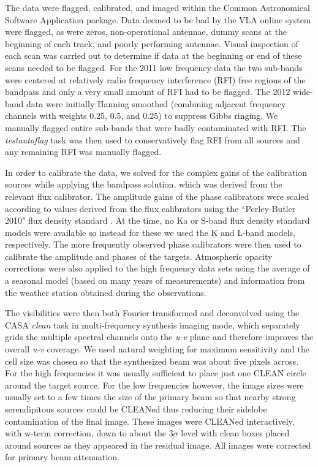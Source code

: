 \documentclass[iop]{emulateapj}
\begin{document}
The data were flagged, calibrated, and imaged within the Common Astronomical Software Application  \cite[CASA;][]{2007ASPC..376..127M} package. Data deemed to be bad by the VLA online system were flagged, as were zeros, non-operational antennae, dummy scans at the beginning of each track, and poorly performing antennae. Visual inspection of each scan was carried out to determine if data at the beginning or end of these scans needed to be flagged. For the 2011 low frequency data the two sub-bands were centered at relatively radio frequency interference (RFI) free regions of the bandpass and only a very small amount of RFI had to be flagged.   The 2012 wide-band data were initially Hanning smoothed (combining adjacent frequency channels with weights 0.25, 0.5, and 0.25) to suppress Gibbs ringing. We manually flagged entire sub-bands that were badly contaminated with RFI. The \textit{testautoflag} task was then used to conservatively flag RFI from all sources and any remaining RFI was manually flagged. 

In order to calibrate the data, we solved for the complex gains of the calibration sources while applying the bandpass solution, which was derived from the relevant flux calibrator.  The amplitude gains of the phase calibrators were scaled according to values derived from the flux calibrators using the ``Perley-Butler 2010" flux density standard \citep{2013ApJS..204...19P}. At the time, no Ka or S-band flux density standard models were available so instead for these we used the K and L-band models, respectively. The more frequently observed phase calibrators were then used to calibrate the amplitude and phases of the targets. Atmospheric opacity corrections were also applied to the high frequency data sets using the average of a seasonal model (based on many years of measurements) and information from the weather station obtained during the observations.

The visibilities were then both Fourier transformed and deconvolved using the CASA \textit{clean} task in multi-frequency synthesis imaging mode, which separately grids the multiple spectral channels onto the \textit{u-v} plane and therefore improves the overall \textit{u-v} coverage. We used natural weighting for maximum sensitivity and the cell size was chosen so that the synthesized beam was about five pixels across. For the high frequencies it was usually sufficient to place just one CLEAN circle around the target source.  For the low frequencies however, the image sizes were usually set to a few times the size of the primary beam so that nearby strong serendipitous sources could be CLEANed thus reducing their sidelobe contamination of the final image. These images were CLEANed interactively, with w-term correction, down to about the $3\sigma$  level with clean boxes placed around sources as they appeared in the residual image. All images were corrected for  primary beam attenuation. 
\end{document}
